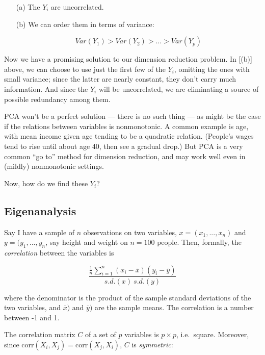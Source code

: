 \begin{itemize}

\item [(a)] The $Y_i$ are uncorrelated.

\item [(b)] We can order them in terms of variance:

\begin{equation}
Var(Y_1) > Var(Y_2) > ... > Var(Y_p)
\end{equation}

\end{itemize} 

Now we have a promising solution to our dimension reduction problem.
In [(b)] above, we can choose to use just the first few of the $Y_i$,
omitting the ones with small variance; since the latter are nearly
constant, they don't carry much information.  And since the $Y_i$ will
be uncorrelated, we are eliminating a source of possible redundancy
among them.

PCA won't be a perfect solution --- there is no such thing --- as might
be the case if the relations between variables is nonmonotonic.  A
common example is age, with mean income given age tending to be a
quadratic relation.  (People's wages tend to rise until about age 40,
then see a gradual drop.) But PCA is a very common ``go to'' method for
dimension reduction, and may work well even in (mildly) nonmonotonic
settings.

Now, how do we find these $Y_i$?

\subsection{Eigenanalysis}

Say I have a sample of $n$ observations on two variables, $x =
(x_1,...,x_n)$ and $y=(y_1,...,y_n$, say height and weight on $n = 100$
people.  Then, formally, the \textit{correlation} between the variables
is

\begin{equation}
\label{corrdef}
\frac
{\frac{1}{n} \sum_{i=1}^n (x_i-\overline{x}) (y_i-\overline{y})}
{s.d.(x) ~ s.d.(y)}
\end{equation}

where the denominator is the product of the sample standard deviations of the
two variables, and $\overline{x})$ and $\overline{y})$ are the sample
means.  The correlation is a number between -1 and 1.

The correlation matrix $C$ of a set of $p$ variables is $p \times p$, i.e.\
square.  Moreover, since $\textrm{corr}(X_i,X_j) = \textrm{corr}(X_j,X_i)$,
$C$ is \textit{symmetric}:

